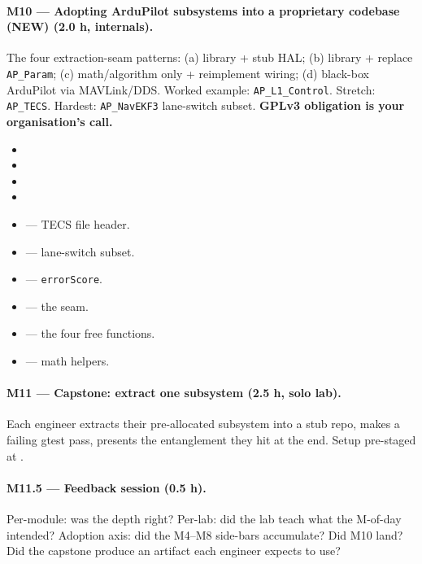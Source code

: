 \documentclass[a4paper,11pt,twoside]{article}
\begin{document}
\paragraph{M10 --- Adopting ArduPilot subsystems into a proprietary codebase (NEW) (2.0 h, internals).}
The four extraction-seam patterns: (a) library + stub HAL; (b) library + replace \texttt{AP\_Param}; (c) math/algorithm only + reimplement wiring; (d) black-box ArduPilot via MAVLink/DDS. Worked example: \texttt{AP\_L1\_Control}. Stretch: \texttt{AP\_TECS}. Hardest: \texttt{AP\_NavEKF3} lane-switch subset. \textbf{GPLv3 obligation is your organisation's call.}
\begin{itemize}
  \item {}
  \item {}
  \item {}
  \item {}
  \item {} --- TECS file header.
  \item {} --- lane-switch subset.
  \item {} --- \texttt{errorScore}.
  \item {} --- the seam.
  \item {} --- the four free functions.
  \item {} --- math helpers.
\end{itemize}

\paragraph{M11 --- Capstone: extract one subsystem (2.5 h, solo lab).}
Each engineer extracts their pre-allocated subsystem into a stub repo, makes a failing gtest pass, presents the entanglement they hit at the end. Setup pre-staged at .

\paragraph{M11.5 --- Feedback session (0.5 h).}
Per-module: was the depth right? Per-lab: did the lab teach what the M-of-day intended? Adoption axis: did the M4--M8 side-bars accumulate? Did M10 land? Did the capstone produce an artifact each engineer expects to use?
\end{document}
